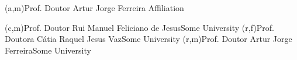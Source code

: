 \ncmember(a,m){Prof. Doutor Artur Jorge Ferreira}{ Affiliation} 

\ncmember(c,m){Prof. Doutor Rui Manuel Feliciano de Jesus}{Some University}
\ncmember(r,f){Prof. Doutora Cátia Raquel Jesus Vaz}{Some University}
\ncmember(r,m){Prof. Doutor Artur Jorge Ferreira}{Some University}





